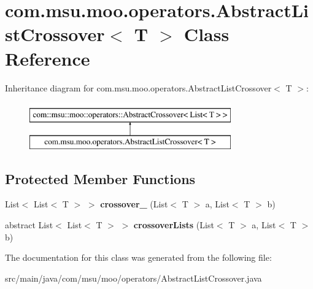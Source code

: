 \hypertarget{classcom_1_1msu_1_1moo_1_1operators_1_1AbstractListCrossover_3_01T_01_4}{\section{com.\-msu.\-moo.\-operators.\-Abstract\-List\-Crossover$<$ T $>$ Class Reference}
\label{classcom_1_1msu_1_1moo_1_1operators_1_1AbstractListCrossover_3_01T_01_4}
}
Inheritance diagram for com.\-msu.\-moo.\-operators.\-Abstract\-List\-Crossover$<$ T $>$\-:\begin{figure}[H]
\begin{center}
\leavevmode
\includegraphics[height=2.000000cm]{classcom_1_1msu_1_1moo_1_1operators_1_1AbstractListCrossover_3_01T_01_4}
\end{center}
\end{figure}
\subsection*{Protected Member Functions}
\begin{DoxyCompactItemize}
\item 
\hypertarget{classcom_1_1msu_1_1moo_1_1operators_1_1AbstractListCrossover_3_01T_01_4_a3ef3d15e49fe5d5a6ffa7488c2d39a34}{List$<$ List$<$ T $>$ $>$ {\bfseries crossover\-\_\-} (List$<$ T $>$ a, List$<$ T $>$ b)}\label{classcom_1_1msu_1_1moo_1_1operators_1_1AbstractListCrossover_3_01T_01_4_a3ef3d15e49fe5d5a6ffa7488c2d39a34}

\item 
\hypertarget{classcom_1_1msu_1_1moo_1_1operators_1_1AbstractListCrossover_3_01T_01_4_aa6507d9fbe91745b023ec164d341e767}{abstract List$<$ List$<$ T $>$ $>$ {\bfseries crossover\-Lists} (List$<$ T $>$ a, List$<$ T $>$ b)}\label{classcom_1_1msu_1_1moo_1_1operators_1_1AbstractListCrossover_3_01T_01_4_aa6507d9fbe91745b023ec164d341e767}

\end{DoxyCompactItemize}


The documentation for this class was generated from the following file\-:\begin{DoxyCompactItemize}
\item 
src/main/java/com/msu/moo/operators/Abstract\-List\-Crossover.\-java\end{DoxyCompactItemize}
